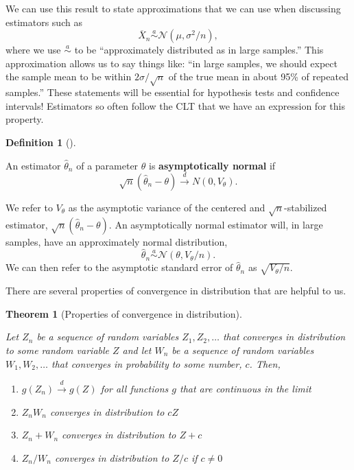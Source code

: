 \documentclass[
  13pt,
  letterpaper,
  DIV=11,
  numbers=noendperiod]{scrreprt}
\providecommand{\tightlist}{%
  \setlength{\itemsep}{0pt}\setlength{\parskip}{0pt}}
\newcommand{\N}{\mathcal{N}}
\newcommand{\Xbar}{\overline{X}}
\newcommand{\indist}{\overset{d}{\to}}
\theoremstyle{plain}
\newtheorem{theorem}{Theorem}[chapter]
\theoremstyle{plain}
\theoremstyle{definition}
\newtheorem{definition}{Definition}[chapter]
\theoremstyle{definition}
\theoremstyle{remark}
\begin{document}
We can use this result to state approximations that we can use when
discussing estimators such as \[
\Xbar_n \overset{a}{\sim} \N(\mu, \sigma^2/n),
\] where we use \(\overset{a}{\sim}\) to be ``approximately distributed
as in large samples.'' This approximation allows us to say things like:
``in large samples, we should expect the sample mean to be within
\(2\sigma/\sqrt{n}\) of the true mean in about 95\% of repeated
samples.'' These statements will be essential for hypothesis tests and
confidence intervals! Estimators so often follow the CLT that we have an
expression for this property.

\begin{definition}[]\protect\hypertarget{def-asymptotically-normal}{}\label{def-asymptotically-normal}

An estimator \(\widehat{\theta}_n\) of a parameter \(\theta\) is
\textbf{asymptotically normal} if \[
\sqrt{n}\left( \widehat{\theta}_n - \theta \right) \indist N\left(0, V_{\theta}\right).
\]

\end{definition}

We refer to \(V_{\theta}\) as the asymptotic variance of the centered
and \(\sqrt{n}\)-stabilized estimator,
\(\sqrt{n}(\widehat{\theta}_n - \theta)\). An asymptotically normal
estimator will, in large samples, have an approximately normal
distribution, \[
\widehat{\theta}_n \overset{a}{\sim} \N(\theta, V_{\theta}/n).
\] We can then refer to the asymptotic standard error of
\(\widehat{\theta}_n\) as \(\sqrt{V_{\theta}/n}\).

There are several properties of convergence in distribution that are
helpful to us.

\begin{theorem}[Properties of convergence in
distribution]\protect\hypertarget{thm-indist-properties}{}\label{thm-indist-properties}

Let \(Z_n\) be a sequence of random variables \(Z_1, Z_2,\ldots\) that
converges in distribution to some random variable \(Z\) and let \(W_n\)
be a sequence of random variables \(W_1, W_2,\ldots\) that converges in
probability to some number, \(c\). Then,

\begin{enumerate}
\def\labelenumi{\arabic{enumi}.}
\tightlist
\item
  \(g(Z_n) \indist g(Z)\) for all functions \(g\) that are continuous in
  the limit
\item
  \(Z_nW_n\) converges in distribution to \(cZ\)
\item
  \(Z_n + W_n\) converges in distribution to \(Z + c\)
\item
  \(Z_n / W_n\) converges in distribution to \(Z / c\) if \(c \neq 0\)
\end{enumerate}

\end{theorem}
\end{document}
